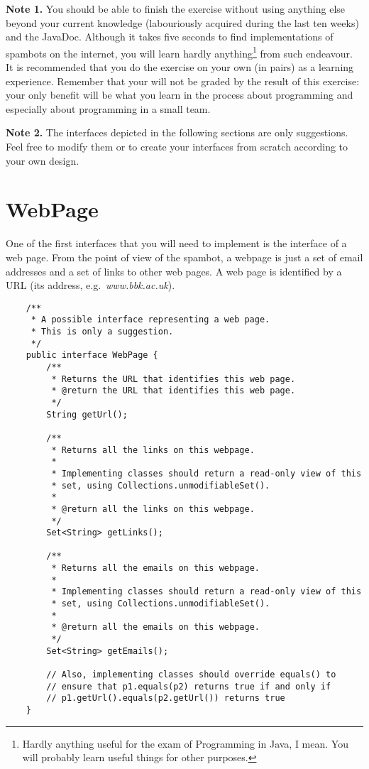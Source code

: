 \documentclass{article}
\begin{document}
\textbf{Note 1.} You should be able to finish the exercise without
using anything else beyond your current knowledge (labouriously
acquired during the last ten weeks) and the JavaDoc. Although it takes
five seconds to find implementations of spambots on the internet, you
will learn hardly anything\footnote{Hardly anything useful for the
  exam of Programming in Java, I mean. You will probably learn useful
  things for other purposes.} from such endeavour. It is recommended
that you do the exercise on your own (in pairs) as a learning
experience. Remember that your will not be graded by the result of
this exercise: your only benefit will be what you learn in the process
about programming and especially about programming in a small team. 

\vspace{1em}

\textbf{Note 2.} The interfaces depicted in the following sections are
only suggestions. Feel free to modify them or to create your
interfaces from scratch according to your own design.

\vspace{1em}

\section{WebPage}
\label{sec:webpage}

One of the first interfaces that you will need to implement is the
interface of a web page. From the point of view of the spambot, a
webpage is just a set of email addresses and a set of links to other
web pages. A web page is identified by a URL (its address,
e.g.~\emph{www.bbk.ac.uk}). 

\begin{verbatim}
    /**
     * A possible interface representing a web page. 
     * This is only a suggestion.
     */
    public interface WebPage {
        /**
         * Returns the URL that identifies this web page. 
         * @return the URL that identifies this web page. 
         */
        String getUrl();

        /**
         * Returns all the links on this webpage.
         *
         * Implementing classes should return a read-only view of this 
         * set, using Collections.unmodifiableSet().
         *
         * @return all the links on this webpage.
         */
        Set<String> getLinks();

        /**
         * Returns all the emails on this webpage.
         *
         * Implementing classes should return a read-only view of this 
         * set, using Collections.unmodifiableSet().
         *
         * @return all the emails on this webpage.
         */
        Set<String> getEmails();

        // Also, implementing classes should override equals() to 
        // ensure that p1.equals(p2) returns true if and only if
        // p1.getUrl().equals(p2.getUrl()) returns true
    }
\end{verbatim}
\end{document}

